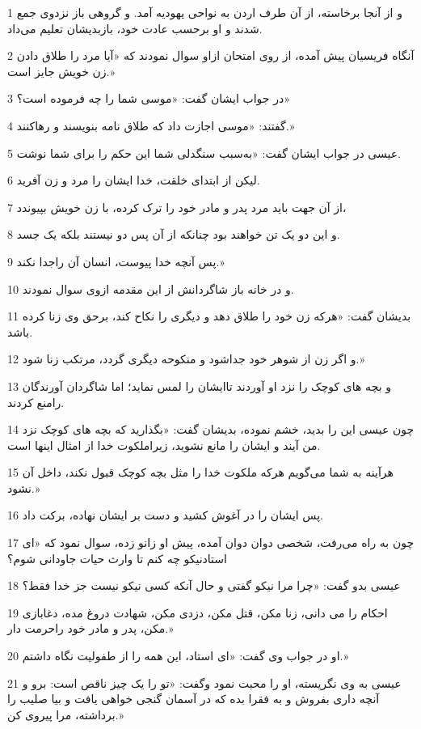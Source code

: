 \par 1 و از آنجا برخاسته، از آن طرف اردن به نواحی یهودیه آمد. و گروهی باز نزدوی جمع شدند و او برحسب عادت خود، بازبدیشان تعلیم می‌داد.
\par 2 آنگاه فریسیان پیش آمده، از روی امتحان ازاو سوال نمودند که «آیا مرد را طلاق دادن زن خویش جایز است.»
\par 3 در جواب ایشان گفت: «موسی شما را چه فرموده است؟»
\par 4 گفتند: «موسی اجازت داد که طلاق نامه بنویسند و رهاکنند.»
\par 5 عیسی در جواب ایشان گفت: «به‌سبب سنگدلی شما این حکم را برای شما نوشت.
\par 6 لیکن از ابتدای خلقت، خدا ایشان را مرد و زن آفرید.
\par 7 از آن جهت باید مرد پدر و مادر خود را ترک کرده، با زن خویش بپیوندد،
\par 8 و این دو یک تن خواهند بود چنانکه از آن پس دو نیستند بلکه یک جسد.
\par 9 پس آنچه خدا پیوست، انسان آن راجدا نکند.»
\par 10 و در خانه باز شاگردانش از این مقدمه ازوی سوال نمودند.
\par 11 بدیشان گفت: «هر‌که زن خود را طلاق دهد و دیگری را نکاح کند، بر‌حق وی زنا کرده باشد.
\par 12 و اگر زن از شوهر خود جداشود و منکوحه دیگری گردد، مرتکب زنا شود.»
\par 13 و بچه های کوچک را نزد او آوردند تاایشان را لمس نماید؛ اما شاگردان آورندگان رامنع کردند.
\par 14 چون عیسی این را بدید، خشم نموده، بدیشان گفت: «بگذارید که بچه های کوچک نزد من آیند و ایشان را مانع نشوید، زیراملکوت خدا از امثال اینها است.
\par 15 هرآینه به شما می‌گویم هر‌که ملکوت خدا را مثل بچه کوچک قبول نکند، داخل آن نشود.»
\par 16 پس ایشان را در آغوش کشید و دست بر ایشان نهاده، برکت داد.
\par 17 چون به راه می‌رفت، شخصی دوان دوان آمده، پیش او زانو زده، سوال نمود که «ای استادنیکو چه کنم تا وارث حیات جاودانی شوم؟
\par 18 عیسی بدو گفت: «چرا مرا نیکو گفتی و حال آنکه کسی نیکو نیست جز خدا فقط؟
\par 19 احکام را می دانی، زنا مکن، قتل مکن، دزدی مکن، شهادت دروغ مده، دغابازی مکن، پدر و مادر خود راحرمت دار.»
\par 20 او در جواب وی گفت: «ای استاد، این همه را از طفولیت نگاه داشتم.»
\par 21 عیسی به وی نگریسته، او را محبت نمود وگفت: «تو را یک چیز ناقص است: برو و آنچه داری بفروش و به فقرا بده که در آسمان گنجی خواهی یافت و بیا صلیب را برداشته، مرا پیروی کن.»
